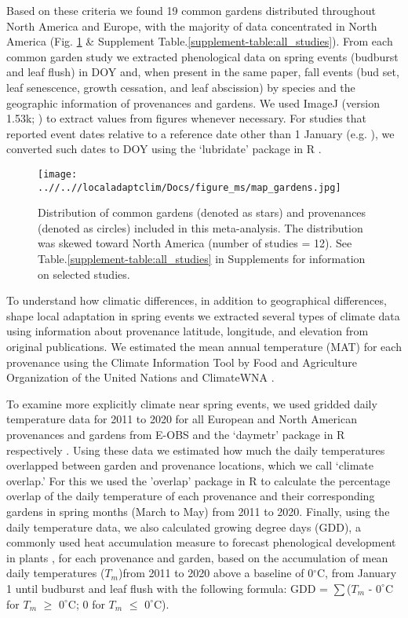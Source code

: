 \documentclass{article}
\begin{document}
Based on these criteria we found 19 common gardens distributed throughout North America and Europe, with the majority of data concentrated in North America (Fig. \ref{figure:map_gardens} \& Supplement Table.\ref{supplement-table:all_studies}). From each common garden study we extracted phenological data on spring events (budburst and leaf flush) in DOY and, when present in the same paper, fall events (bud set, leaf senescence, growth cessation, and leaf abscission) by species and the geographic information of provenances and gardens. We used ImageJ (version 1.53k; \citealp{schneider_rasband_eliceiri_2012}) to extract values from figures whenever necessary. For studies that reported event dates relative to a reference date other than 1 January (e.g. \citealp{Rehfeldt1994}), we converted such dates to DOY using the `lubridate' package in R \citep{Grolemund11}. %
\begin{figure}[!h] 
    \centering
 \texttt{[image: ..//..//localadaptclim/Docs/figure\_ms/map\_gardens.jpg]}
    \caption{Distribution of common gardens (denoted as stars) and provenances (denoted as circles) included in this meta-analysis. The distribution was skewed toward North America (number of studies = 12). See Table.\ref{supplement-table:all_studies} in Supplements for information on selected studies.}  %
    \label{figure:map_gardens}
\end{figure}
\newline
To understand how climatic differences, in addition to geographical differences, shape local adaptation in spring events we extracted several types of climate data using information about provenance latitude, longitude, and elevation from original publications. We estimated the mean annual temperature (MAT) for each provenance using the Climate Information Tool by Food and Agriculture Organization of the United Nations \citep{FAO2022}and ClimateWNA \citep{wang2016}. 

To examine more explicitly climate near spring events, we used gridded daily temperature data for 2011 to 2020 for all European and North American provenances and gardens from E-OBS and the `daymetr' package in R respectively \citep{cornes2018,hufkens2018}. Using these data we estimated how much the daily temperatures overlapped between garden and provenance locations, which we call `climate overlap.' For this we used the 'overlap' package in R to calculate the percentage overlap of the daily temperature of each provenance and their corresponding gardens in spring months (March to May) from 2011 to 2020. Finally, using the daily temperature data, we also calculated growing degree days (GDD), a commonly used heat accumulation measure to forecast phenological development in plants \citep{miller01}, for each provenance and garden, based on the accumulation of mean daily temperatures ($T_{m}$)from 2011 to 2020 above a baseline of 0$^{\circ}$C, from January 1 until budburst and leaf flush with the following formula: GDD = $\sum$($T_{m}$ - $0^{\circ}$C for $T_{m}$ $\ge$ $0^{\circ}$C; 0 for $T_{m}$ $\le$ $0^{\circ}$C). 
\end{document}

